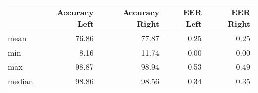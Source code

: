 \begin{tabular}{lrrrr}
\toprule
{} &  Accuracy Left &  Accuracy Right &  EER Left &  EER Right \\
\midrule
mean   &          76.86 &           77.87 &      0.25 &       0.25 \\
min    &           8.16 &           11.74 &      0.00 &       0.00 \\
max    &          98.87 &           98.94 &      0.53 &       0.49 \\
median &          98.86 &           98.56 &      0.34 &       0.35 \\
\bottomrule
\end{tabular}
